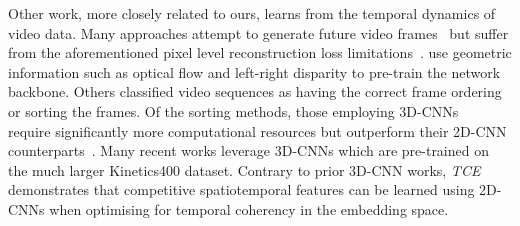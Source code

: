 \documentclass[a4paper,conference]{IEEEtran}
\begin{document}
Other work, more closely related to ours, learns from the temporal dynamics of video data. Many approaches attempt to generate future video frames~\cite{lotter2016deep,mathieu2015deep,srivastava2015unsupervised,vondrick2016generating} but suffer from the aforementioned pixel level reconstruction loss limitations~\cite{zhang2017split,han2019video}.  \cite{gan2018geometry} use geometric information such as optical flow and left-right disparity to pre-train the network backbone. Others classified video sequences as having the correct frame ordering~\cite{fernando2017self,misra2016shuffle} or sorting the frames.   Of the sorting methods, those employing 3D-CNNs~\cite{el2019skip,kim2019self,xu2019self, han2019video} require significantly more computational resources but outperform their 2D-CNN counterparts~\cite{lee2017unsupervised}. Many recent works leverage 3D-CNNs which are pre-trained on the much larger Kinetics400 dataset. Contrary to prior 3D-CNN works, \textit{TCE} demonstrates that competitive spatiotemporal features can be learned using 2D-CNNs when optimising for temporal coherency in the embedding space.
\end{document}
